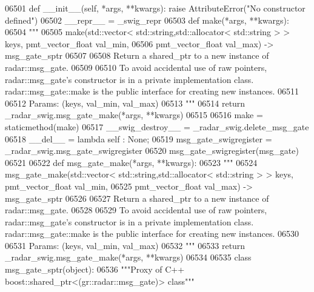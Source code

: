 \begin{DoxyCode}
{{{{{{{{{{{{{{{{{{{{{{06501     \textcolor{keyword}{def }__init__(self, *args, **kwargs): \textcolor{keywordflow}{raise} AttributeError(\textcolor{stringliteral}{"No constructor defined"})
06502     \_\_repr\_\_ = \_swig\_repr
06503     \textcolor{keyword}{def }make(*args, **kwargs):
06504         \textcolor{stringliteral}{"""}
06505 \textcolor{stringliteral}{        make(std::vector< std::string,std::allocator< std::string > > keys, pmt\_vector\_float val\_min, }
06506 \textcolor{stringliteral}{            pmt\_vector\_float val\_max) -> msg\_gate\_sptr}
06507 \textcolor{stringliteral}{}
06508 \textcolor{stringliteral}{        Return a shared\_ptr to a new instance of radar::msg\_gate.}
06509 \textcolor{stringliteral}{}
06510 \textcolor{stringliteral}{        To avoid accidental use of raw pointers, radar::msg\_gate's constructor is in a private
       implementation class. radar::msg\_gate::make is the public interface for creating new instances.}
06511 \textcolor{stringliteral}{}
06512 \textcolor{stringliteral}{        Params: (keys, val\_min, val\_max)}
06513 \textcolor{stringliteral}{        """}
06514         \textcolor{keywordflow}{return} \_radar\_swig.msg\_gate\_make(*args, **kwargs)
06515 
06516     make = staticmethod(make)
06517     \_\_swig\_destroy\_\_ = \_radar\_swig.delete\_msg\_gate
06518     \_\_del\_\_ = \textcolor{keyword}{lambda} self : \textcolor{keywordtype}{None};
06519 msg\_gate\_swigregister = \_radar\_swig.msg\_gate\_swigregister
06520 msg_gate_swigregister(msg\_gate)
06521 
06522 \textcolor{keyword}{def }msg_gate_make(*args, **kwargs):
06523   \textcolor{stringliteral}{"""}
06524 \textcolor{stringliteral}{    msg\_gate\_make(std::vector< std::string,std::allocator< std::string > > keys, pmt\_vector\_float val\_min, }
06525 \textcolor{stringliteral}{        pmt\_vector\_float val\_max) -> msg\_gate\_sptr}
06526 \textcolor{stringliteral}{}
06527 \textcolor{stringliteral}{    Return a shared\_ptr to a new instance of radar::msg\_gate.}
06528 \textcolor{stringliteral}{}
06529 \textcolor{stringliteral}{    To avoid accidental use of raw pointers, radar::msg\_gate's constructor is in a private implementation
       class. radar::msg\_gate::make is the public interface for creating new instances.}
06530 \textcolor{stringliteral}{}
06531 \textcolor{stringliteral}{    Params: (keys, val\_min, val\_max)}
06532 \textcolor{stringliteral}{    """}
06533   \textcolor{keywordflow}{return} \_radar\_swig.msg\_gate\_make(*args, **kwargs)
06534 
06535 \textcolor{keyword}{class }msg_gate_sptr(object):
06536     \textcolor{stringliteral}{"""Proxy of C++ boost::shared\_ptr<(gr::radar::msg\_gate)> class"""}
}}}}}}}}}}}}}}}}}}}}}}
\end{DoxyCode}
